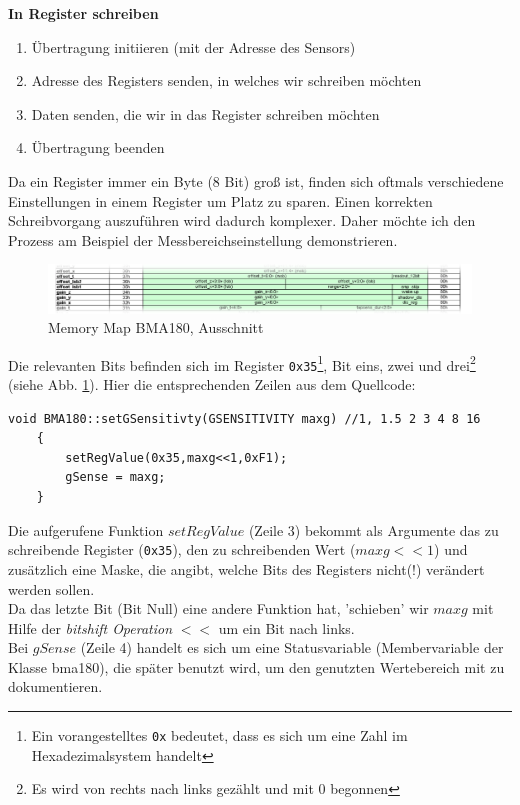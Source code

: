 \documentclass[12pt,a4paper,twoside,BCOR=12.5mm]{scrartcl}
\begin{document}
\textbf{In Register schreiben}
\begin{enumerate}
	\item Übertragung initiieren (mit der Adresse des Sensors)
	\item Adresse des Registers senden, in welches wir schreiben möchten
	\item Daten senden, die wir in das Register schreiben möchten
	\item Übertragung beenden
\end{enumerate}

Da ein Register immer ein Byte (8 Bit) groß ist, finden sich oftmals verschiedene Einstellungen in einem Register um Platz zu sparen. Einen korrekten Schreibvorgang auszuführen wird dadurch komplexer. Daher möchte ich den Prozess am Beispiel der Messbereichseinstellung demonstrieren.

\begin{figure}[H]
\includegraphics[scale=.33]{registerstransp}
\caption{Memory Map BMA180, Ausschnitt \citep{Sensortec:2009rt}}
\label{registermap}
\end{figure}

Die relevanten Bits befinden sich im Register \texttt{0x35}\footnote{Ein vorangestelltes \texttt{0x} bedeutet, dass es sich um eine Zahl im Hexadezimalsystem handelt}, Bit eins, zwei und drei\footnote{Es wird von rechts nach links gezählt und mit 0 begonnen} (siehe Abb. \ref{registermap}). Hier die entsprechenden Zeilen aus dem Quellcode:

\lstset{frameround=fttt}
\begin{lstlisting}[frame=trBL]
	void BMA180::setGSensitivty(GSENSITIVITY maxg) //1, 1.5 2 3 4 8 16
	{
	    setRegValue(0x35,maxg<<1,0xF1);
	    gSense = maxg;
	}
\end{lstlisting}
 
Die aufgerufene Funktion $setRegValue$ (Zeile 3) bekommt als Argumente das zu schreibende Register (\texttt{0x35}), den zu schreibenden Wert ($maxg << 1$) und zusätzlich eine Maske, die angibt, welche Bits des Registers nicht(!) verändert werden sollen.\\
Da das letzte Bit (Bit Null) eine andere Funktion hat, 'schieben' wir $maxg$ mit Hilfe der \textit{bitshift Operation} $<<$ um ein Bit nach links.\\
Bei $gSense$ (Zeile 4) handelt es sich um eine Statusvariable (Membervariable der Klasse bma180), die später benutzt wird, um den genutzten Wertebereich mit zu dokumentieren.
\end{document}
